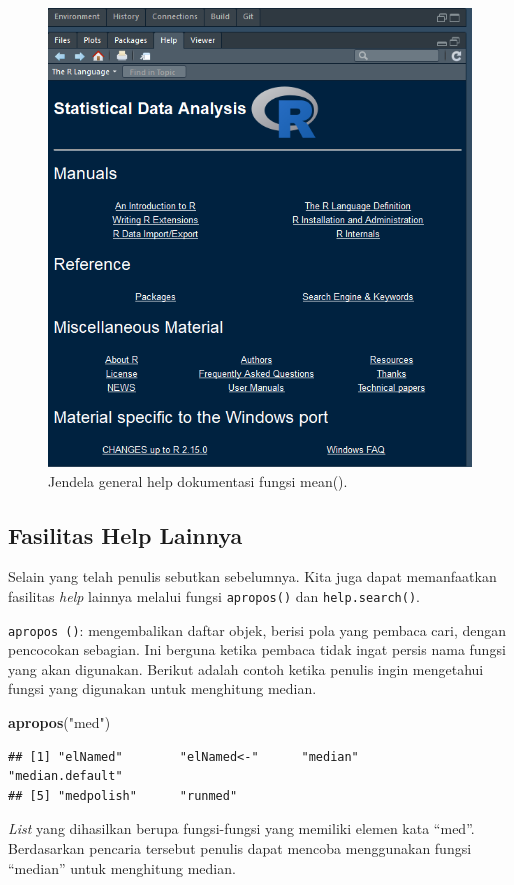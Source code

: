 \documentclass[]{book}
\newenvironment{Shaded}{\begin{snugshade}}{\end{snugshade}}
\newcommand{\KeywordTok}[1]{\textcolor[rgb]{0.13,0.29,0.53}{\textbf{#1}}}
\newcommand{\NormalTok}[1]{#1}
\newcommand{\StringTok}[1]{\textcolor[rgb]{0.31,0.60,0.02}{#1}}
\theoremstyle{definition}
\theoremstyle{definition}
\theoremstyle{definition}
\theoremstyle{remark}
\begin{document}
\begin{figure}

{\centering \includegraphics[width=0.5\linewidth]{./images/generalhelp} 

}

\caption{Jendela general help dokumentasi fungsi mean().}\label{fig:generalhelp}
\end{figure}

\hypertarget{othershelp}{%
\subsection{Fasilitas Help Lainnya}\label{othershelp}}

Selain yang telah penulis sebutkan sebelumnya. Kita juga dapat memanfaatkan fasilitas \emph{help} lainnya melalui fungsi \texttt{apropos()} dan \texttt{help.search()}.

\texttt{apropos\ ()}: mengembalikan daftar objek, berisi pola yang pembaca cari, dengan pencocokan sebagian. Ini berguna ketika pembaca tidak ingat persis nama fungsi yang akan digunakan. Berikut adalah contoh ketika penulis ingin mengetahui fungsi yang digunakan untuk menghitung median.

\begin{Shaded}
\begin{Highlighting}[]
\KeywordTok{apropos}\NormalTok{(}\StringTok{"med"}\NormalTok{)}
\end{Highlighting}
\end{Shaded}

\begin{verbatim}
## [1] "elNamed"        "elNamed<-"      "median"         "median.default"
## [5] "medpolish"      "runmed"
\end{verbatim}

\emph{List} yang dihasilkan berupa fungsi-fungsi yang memiliki elemen kata ``med''. Berdasarkan pencaria tersebut penulis dapat mencoba menggunakan fungsi ``median'' untuk menghitung median.
\end{document}
